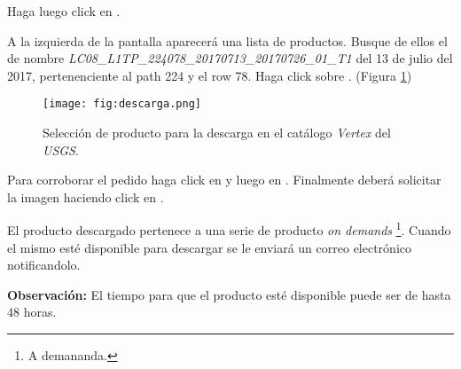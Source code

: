 Haga luego click en .

A la izquierda de la pantalla aparecerá una lista de productos. Busque de ellos el de nombre \emph{LC08_L1TP_224078_20170713_20170726_01_T1
} del 13 de julio del 2017, pertenenciente al path 224 y el row 78. Haga click sobre . (Figura \ref{fig:seleccion})

\begin{figure}[h!]
    \centering
    \texttt{[image: fig:descarga.png]}
    \caption{Selección de producto para la descarga en el catálogo \emph{Vertex} del \emph{USGS}.}
    \label{fig:seleccion}
\end{figure}

Para corroborar el pedido haga click en  y luego en . Finalmente deberá solicitar la imagen haciendo click en .

El producto descargado pertenece a una serie de producto \emph{on demands} \footnote{A demananda.}. Cuando el mismo esté disponible para descargar se le enviará un correo electrónico notificandolo.

\textbf{Observación:} El tiempo para que el producto esté disponible puede ser de hasta 48 horas.
